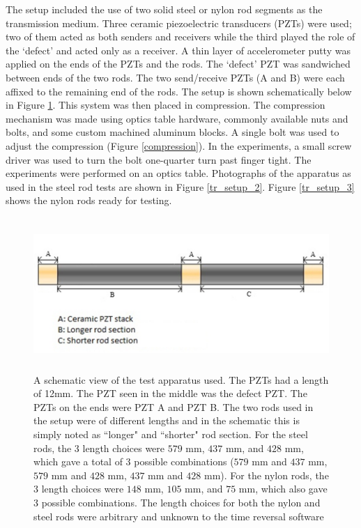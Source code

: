 \documentclass[11pt,letterpaper]{article}%
\begin{document}
The setup included the use of two solid steel or nylon rod segments as the transmission medium. Three ceramic piezoelectric
transducers (PZTs) were used; two of them acted as both senders and
receivers while the third played the role of the `defect' and acted
only as a receiver. A thin layer of accelerometer putty was applied on the ends of the PZTs and the rods. The `defect' PZT was sandwiched between ends of
the two rods. The two send/receive PZTs (A and B) were each affixed to the remaining end of the rods. The setup is shown schematically below in
Figure \ref{tr_setup_1}. This system was then
placed in compression. The compression mechanism was made using optics table hardware, commonly available nuts and bolts, and some custom machined aluminum blocks. A single bolt was used to adjust the compression (Figure \ref{compression}). In the experiments, a small screw driver was used to turn the bolt one-quarter turn past finger tight. The experiments were performed on an optics table. Photographs of the apparatus as used in
the steel rod tests are shown in Figure \ref{tr_setup_2}. Figure \ref{tr_setup_3} shows the nylon rods ready for testing. 

\begin{figure}
\begin{center}
\includegraphics[width=13cm,height=5.8cm]{tr_dimensions}
\end{center}
 \caption[des1]
   { \label{tr_setup_1}
A schematic view of the test apparatus used. The PZTs had a length of 12mm. The PZT seen in the middle was the defect PZT. The PZTs on the ends were PZT A and PZT B. The two rods used in the setup were of different lengths and in the schematic this is simply noted as ``longer" and ``shorter" rod section. For the steel rods, the 3 length choices were $579$ mm, $437$ mm, and $428$ mm, which gave a total of 3 possible combinations ($579$ mm and $437$ mm, $579$ mm and $428$ mm, $437$ mm and $428$ mm). For the nylon rods, the 3 length choices were $148$ mm, $105$ mm, and $75$ mm, which also gave 3 possible combinations. The length choices for both the nylon and steel rods were arbitrary and unknown to the time reversal software }
\end{figure}
\end{document}
